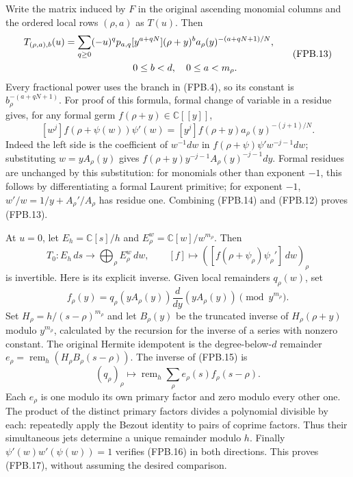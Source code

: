Write the matrix induced by \(F\) in the original ascending monomial
columns and the ordered local rows \((\rho,a)\) as \(T(u)\). Then
\[
 \begin{split}
 T_{(\rho,a),b}(u)
 &=\sum_{q\ge0}(-u)^q p_{a,q}
   [y^{a+qN}](\rho+y)^b
       a_\rho(y)^{-(a+qN+1)/N},\\
 &\hspace{25mm}0\le b<d,\quad 0\le a<m_\rho.
 \end{split}
 \tag{FPB.13}\label{GraphV2:eq:fpb-T}
\]
Every fractional power uses the branch in (FPB.4), so its constant
is \(b_\rho^{-(a+qN+1)}\). For proof of this formula, formal
change of variable in a residue gives, for any formal germ
\(f(\rho+y)\in\mathbb{C}[[y]]\),
\[
 [w^j]f(\rho+\psi(w))\psi'(w)
   =[y^j]f(\rho+y)a_\rho(y)^{-(j+1)/N}.
 \tag{FPB.14}\label{GraphV2:eq:fpb-residue}
\]
Indeed the left side is the coefficient of \(w^{-1}dw\) in
\(f(\rho+\psi)\psi' w^{-j-1}dw\); substituting
\(w=yA_\rho(y)\) gives
\(f(\rho+y)y^{-j-1}A_\rho(y)^{-j-1}dy\). Formal residues are
unchanged by this substitution: for monomials other than exponent
\(-1\), this follows by differentiating a formal Laurent primitive;
for exponent \(-1\), \(w'/w=1/y+A_\rho'/A_\rho\) has residue one.
Combining (FPB.14) and (FPB.12) proves (FPB.13).

At \(u=0\), let \(E_h=\mathbb{C}[s]/h\) and
\(E_\rho^w=\mathbb{C}[w]/w^{m_\rho}\). Then
\[
 T_0:E_h\,ds\longrightarrow\bigoplus_\rho E_\rho^w\,dw,
 \qquad [f]\longmapsto
   ([f(\rho+\psi_\rho)\psi_\rho']\,dw)_\rho
 \tag{FPB.15}\label{GraphV2:eq:fpb-T0}
\]
is invertible. Here is its explicit inverse. Given local remainders
\(q_\rho(w)\), set
\[
 f_\rho(y)=q_\rho(yA_\rho(y))
       \frac{d}{dy}(yA_\rho(y))\pmod {y^{m_\rho}}.
 \tag{FPB.16}\label{GraphV2:eq:fpb-inverse-jet}
\]
Set \(H_\rho=h/(s-\rho)^{m_\rho}\) and let \(B_\rho(y)\) be the
truncated inverse of \(H_\rho(\rho+y)\) modulo \(y^{m_\rho}\),
calculated by the recursion for the inverse of a series with nonzero
constant. The original Hermite idempotent is the degree-below-\(d\)
remainder
\(e_\rho=\operatorname{rem}_h(H_\rho B_\rho(s-\rho))\).
The inverse of (FPB.15) is
\[
 (q_\rho)_\rho\longmapsto
  \operatorname{rem}_h\sum_\rho e_\rho(s)f_\rho(s-\rho).
 \tag{FPB.17}\label{GraphV2:eq:fpb-CRT}
\]
Each \(e_\rho\) is one modulo its own primary factor and zero
modulo every other one. The product of the distinct primary factors
divides a polynomial divisible by each: repeatedly apply the Bezout
identity to pairs of coprime factors. Thus their simultaneous jets
determine a unique remainder modulo \(h\). Finally
\(\psi'(w)w'(\psi(w))=1\) verifies (FPB.16) in both directions.
This proves (FPB.17), without assuming the desired comparison.

